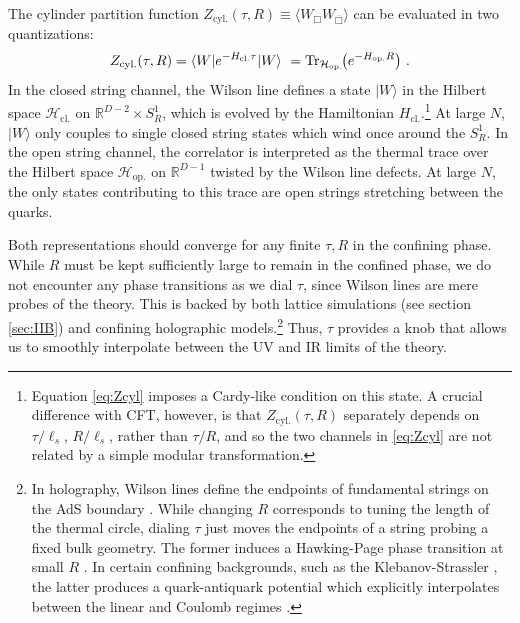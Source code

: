 \documentclass[
 reprint,
 amsmath,
 pre,
 amssymb,
 nofootinbib,
 aps,
 longbibliography,
]{revtex4-1}
\newcommand{\<}{{\langle}}
\renewcommand{\>}{{\rangle}}
\begin{document}
The cylinder partition function $Z_{\text{cyl.}}(\tau ,R) \equiv   \langle W_{\Box} W_{\overline{\Box}}\rangle$ can be evaluated in two quantizations:
\begin{equation}\label{eq:Zcyl}
    Z_{\text{cyl.}}(\tau ,R) = \langle W| e^{-H_{\text{cl.}} \tau}|W \rangle\ = \text{Tr}_{\mathcal H_\text{op.}}\hspace{-3pt}\left(e^{-H_{\text{op.}} R}\right) \,.
\end{equation}
In the closed string channel, the Wilson line defines a state $|W\rangle$ in the Hilbert space $\mathcal H_\text{cl.}$ on $\mathbb R^{D-2}\times S^1_R$, which is evolved by the Hamiltonian $H_\text{cl.}$.\footnote{Equation \eqref{eq:Zcyl} imposes a Cardy-like condition \cite{Cardy:1989ir} on this state. A crucial difference with CFT, however, is that $Z_{\text{cyl.}}(\tau ,R)$ separately depends on $\tau/\ell_s$, $R/\ell_s$, rather than $\tau/R$, and so the two channels in \eqref{eq:Zcyl} are not related by a simple modular transformation.} At large $N$, $|W\rangle$ only couples to single closed string states which wind once around the $S^1_R$. In the open string channel, the correlator is interpreted as the thermal trace over the Hilbert space $\mathcal H_\text{op.}$ on $\mathbb R^{D-1}$ twisted by the Wilson line defects. At large $N$, the only states contributing to this trace are open strings stretching between the quarks.


Both representations should converge for any finite $\tau, R$ in the confining phase.
While $R$ must be kept sufficiently large to remain in the confined phase,
we do not encounter any phase transitions as we dial $\tau$, since Wilson lines are mere probes of the theory.
This is backed by both lattice simulations (see section \ref{sec:IIB}) and confining holographic models.\footnote{
In holography, Wilson lines define the endpoints of fundamental strings on the AdS boundary \cite{Maldacena:1998im}.
While changing $R$ corresponds to tuning the length of the thermal circle, dialing $\tau$ just moves the endpoints of a string probing a fixed bulk geometry. The former induces a Hawking-Page phase transition at small $R$ \cite{Witten:1998zw}. In certain confining backgrounds, such as the Klebanov-Strassler \cite{Klebanov:2000hb}, the latter produces a quark-antiquark potential which explicitly interpolates between the linear and Coulomb regimes \cite{Cvicek:2007}.} Thus, $\tau$ provides a knob that allows us to smoothly interpolate between the UV and IR limits of the theory.
\end{document}
